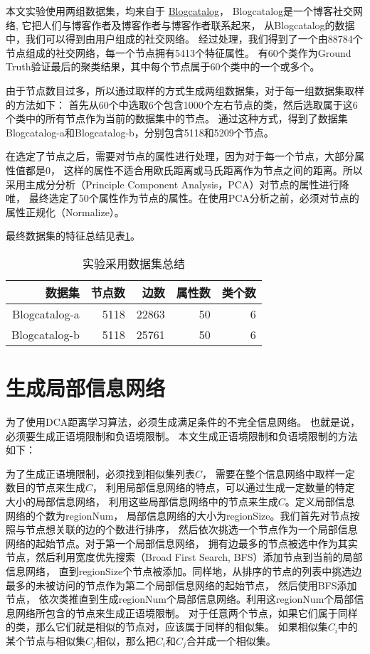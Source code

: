 本文实验使用两组数据集，均来自于
\href{http://www.blogcatalog.com/}{Blogcatalog}，
Blogcatalog是一个博客社交网络, 它把人们与博客作者及博客作者与博客作者联系起来，
从Blogcatalog的数据中，我们可以得到由用户组成的社交网络。
经过处理，我们得到了一个由88784个节点组成的社交网络，每一个节点拥有5413个特征属性。
有60个类作为Ground Truth验证最后的聚类结果，其中每个节点属于60个类中的一个或多个。

由于节点数目过多，所以通过取样的方式生成两组数据集，对于每一组数据集取样的方法如下：
首先从60个中选取6个包含1000个左右节点的类，然后选取属于这6个类中的所有节点作为当前的数据集中的节点。
通过这种方式，得到了数据集Blogcatalog-a和Blogcatalog-b，分别包含5118和5209个节点。

在选定了节点之后，需要对节点的属性进行处理，因为对于每一个节点，大部分属性值都是0，
这样的属性不适合用欧氏距离或马氏距离作为节点之间的距离。所以采用主成分分析（Principle Component Analysis，PCA）对节点的属性进行降唯，
最终选定了50个属性作为节点的属性。在使用PCA分析之前，必须对节点的属性正规化（Normalize）。

最终数据集的特征总结见表\ref{tab:datasetsummary}。

\begin{table}[!hpb]
  \centering
  \caption{实验采用数据集总结}
  \label{tab:datasetsummary}
  \begin{tabular}{rrrrr} \toprule
    数据集 & 节点数 & 边数  & 属性数 & 类个数\\ \midrule
    Blogcatalog-a & 5118 & 22863 & 50 & 6 \\
    Blogcatalog-b & 5118 & 25761  & 50 & 6 \\ \bottomrule
  \end{tabular}
\end{table}


\section{生成局部信息网络}

为了使用DCA距离学习算法，必须生成满足条件的不完全信息网络。
也就是说，必须要生成正语境限制和负语境限制。
本文生成正语境限制和负语境限制的方法如下：

为了生成正语境限制，必须找到相似集列表$C$，
需要在整个信息网络中取样一定数目的节点来生成$C$，
利用局部信息网络的特点，可以通过生成一定数量的特定大小的局部信息网络，
利用这些局部信息网络中的节点来生成$C$。定义局部信息网络的个数为regionNum，
局部信息网络的大小为regionSize。我们首先对节点按照与节点想关联的边的个数进行排序，
然后依次挑选一个节点作为一个局部信息网络的起始节点。对于第一个局部信息网络，
拥有边最多的节点被选中作为其实节点，然后利用宽度优先搜索（Broad First Search, BFS）添加节点到当前的局部信息网络，
直到regionSize个节点被添加。同样地，从排序的节点的列表中挑选边最多的未被访问的节点作为第二个局部信息网络的起始节点，
然后使用BFS添加节点，
依次类推直到生成regionNum个局部信息网络。利用这regionNum个局部信息网络所包含的节点来生成正语境限制。
对于任意两个节点，如果它们属于同样的类，那么它们就是相似的节点对，应该属于同样的相似集。
如果相似集$C_i$中的某个节点与相似集$C_j$相似，那么把$C_i$和$C_j$合并成一个相似集。

